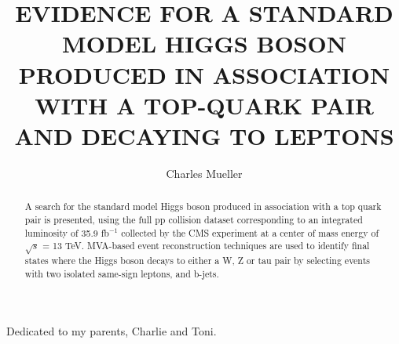 \documentclass[final,numrefs,sort&compress,noinfo]{nddiss2e}
\begin{document}
\frontmatter         %

\title{EVIDENCE FOR A STANDARD MODEL HIGGS BOSON PRODUCED IN ASSOCIATION WITH A TOP-QUARK PAIR AND DECAYING TO LEPTONS}
\author{Charles Mueller}           %

\maketitle           %

\makecopyright



\begin{abstract}
A search for the standard model Higgs boson produced in association with a top quark pair is presented, using the full pp collision
dataset corresponding to an integrated luminosity of 35.9 fb$^{-1}$ collected by the CMS experiment at a center of mass energy of $\sqrt{s}$ = 13 TeV.
MVA-based event reconstruction techniques are used to identify final states where the Higgs boson decays to either a W, Z or tau pair by
selecting events with two isolated same-sign leptons, and b-jets.
\end{abstract}


\begin{dedication}
Dedicated to my parents, Charlie and Toni.
\end{dedication}
\end{document}
